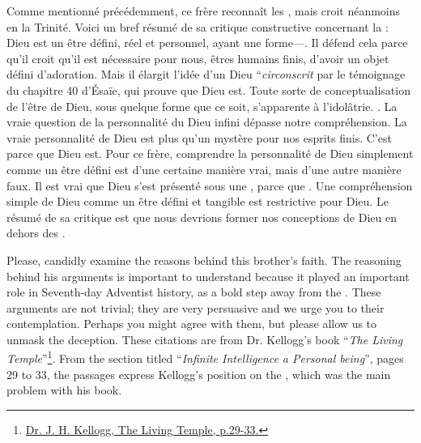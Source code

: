 Comme mentionné précédemment, ce frère reconnaît les , mais croit néanmoins en la Trinité. Voici un bref résumé de sa critique constructive concernant la : Dieu est un être défini, réel et personnel, ayant une forme—. Il défend cela parce qu'il croit qu'il est nécessaire pour nous, êtres humains finis, d'avoir un objet défini d'adoration. Mais il élargit l'idée d'un Dieu “\textit{circonscrit} par le témoignage du chapitre 40 d'Ésaïe, qui prouve que Dieu est. Toute sorte de conceptualisation de l'être de Dieu, sous quelque forme que ce soit, s'apparente à l'idolâtrie. . La vraie question de la personnalité du Dieu infini dépasse notre compréhension. La vraie personnalité de Dieu est plus qu'un mystère pour nos esprits finis. C'est parce que Dieu est. Pour ce frère, comprendre la personnalité de Dieu simplement comme un être défini est d'une certaine manière vrai, mais d'une autre manière faux. Il est vrai que Dieu s'est présenté sous une , parce que . Une compréhension simple de Dieu comme un être défini et tangible est restrictive pour Dieu. Le résumé de sa critique est que nous devrions former nos conceptions de Dieu en dehors des .


Please, candidly examine the reasons behind this brother’s faith. The reasoning behind his arguments is important to understand because it played an important role in Seventh-day Adventist history, as a bold step away from the . These arguments are not trivial; they are very persuasive and we urge you to their contemplation. Perhaps you might agree with them, but please allow us to unmask the deception. These citations are from Dr. Kellogg’s book “\textit{The Living Temple}”\footnote{\href{https://archive.org/details/J.H.Kellogg.TheLivingTemple1903}{Dr. J. H. Kellogg, The Living Temple, p.29-33.}}. From the section titled “\textit{Infinite Intelligence a Personal being}”, pages 29 to 33, the passages express Kellogg’s position on the , which was the main problem with his book.


